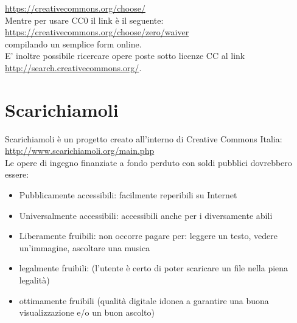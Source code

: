 \url{https://creativecommons.org/choose/}\\

Mentre per usare CC0 il link è il seguente: \\

\url{https://creativecommons.org/choose/zero/waiver}\\

compilando un semplice form online.\\

E' inoltre possibile ricercare opere poste sotto licenze CC al link \\

\url{http://search.creativecommons.org/}.\\

\section{Scarichiamoli}

Scarichiamoli è un progetto creato all'interno di Creative Commons
Italia: \\

\url{http://www.scarichiamoli.org/main.php} \\

Le opere di ingegno finanziate a fondo perduto con soldi pubblici dovrebbero essere:

\begin{itemize}
\item Pubblicamente accessibili: facilmente reperibili su Internet
\item Universalmente accessibili: accessibili anche per i diversamente abili
\item Liberamente fruibili: non occorre pagare per: leggere un testo, vedere un'immagine, ascoltare una musica
\item legalmente fruibili: (l'utente è certo di poter scaricare un file nella piena legalità)
\item ottimamente fruibili (qualità digitale idonea a garantire una buona visualizzazione e/o un buon ascolto)
\end{itemize}